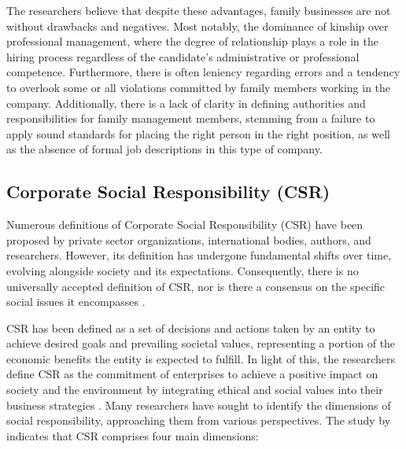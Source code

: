 \documentclass[10pt]{NSP1}
\begin{document}
The researchers believe that despite these advantages, family businesses are not without drawbacks and negatives. Most notably, the dominance of kinship over professional management, where the degree of relationship plays a role in the hiring process regardless of the candidate's administrative or professional competence. Furthermore, there is often leniency regarding errors and a tendency to overlook some or all violations committed by family members working in the company. Additionally, there is a lack of clarity in defining authorities and responsibilities for family management members, stemming from a failure to apply sound standards for placing the right person in the right position, as well as the absence of formal job descriptions in this type of company.

\subsection{Corporate Social Responsibility (CSR)}

Numerous definitions of Corporate Social Responsibility (CSR) have been proposed by private sector organizations, international bodies, authors, and researchers. However, its definition has undergone fundamental shifts over time, evolving alongside society and its expectations. Consequently, there is no universally accepted definition of CSR, nor is there a consensus on the specific social issues it encompasses \cite{Habbash2018}.

CSR has been defined as a set of decisions and actions taken by an entity to achieve desired goals and prevailing societal values, representing a portion of the economic benefits the entity is expected to fulfill. In light of this, the researchers define CSR as the commitment of enterprises to achieve a positive impact on society and the environment by integrating ethical and social values into their business strategies \cite{Ali2023, Ismail2022, Nugroho2021, Nyore2021}. Many researchers have sought to identify the dimensions of social responsibility, approaching them from various perspectives. The study by \cite{Saleh2021} indicates that CSR comprises four main dimensions:
\end{document}
